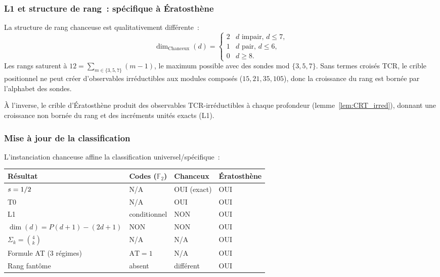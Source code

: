 \documentclass[12pt,a4paper]{article}
\begin{document}
\subsubsection{L1 et structure de rang~: spécifique à Ératosthène}

La structure de rang chanceuse est qualitativement différente~:
\[
  \dim_{\mathrm{Chanceux}}(d) = \begin{cases}
    2 & d \text{ impair, } d \le 7, \\
    1 & d \text{ pair, } d \le 6, \\
    0 & d \ge 8.
  \end{cases}
\]
Les rangs saturent à $12 = \sum_{m \in \{3,5,7\}} (m - 1)$, le
maximum possible avec des sondes mod $\{3, 5, 7\}$. Sans termes
croisés TCR, le crible positionnel ne peut créer d'observables
irréductibles aux modules composés ($15, 21, 35, 105$), donc la
croissance du rang est bornée par l'alphabet des sondes.

À l'inverse, le crible d'Ératosthène produit des observables
TCR-irréductibles à chaque profondeur (lemme~\ref{lem:CRT_irred}),
donnant une croissance non bornée du rang et des incréments unités
exacts (L1).

\subsubsection{Mise à jour de la classification}

L'instanciation chanceuse affine la classification
universel/spécifique~:

\begin{center}
\begin{tabular}{llll}
\toprule
\textbf{Résultat} & \textbf{Codes ($\mathbb{F}_2$)} & \textbf{Chanceux} & \textbf{Ératosthène} \\
\midrule
$s = 1/2$ & N/A & OUI (exact) & OUI \\
T0 & N/A & OUI & OUI \\
L1 & conditionnel & NON & OUI \\
$\dim(d) = P(d{+}1) - (2d{+}1)$ & NON & NON & OUI \\
$\Sigma_k = \binom{4}{k}$ & N/A & N/A & OUI \\
Formule AT (3 régimes) & $\mathrm{AT} = 1$ & N/A & OUI \\
Rang fantôme & absent & différent & OUI \\
\bottomrule
\end{tabular}
\end{center}
\end{document}
